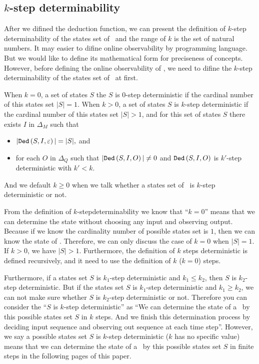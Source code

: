 \subsection{$k$-step determinability}
After we difined the deduction function, we can present the definition of $k$-step determinability of the states set of \BCNs\ and the range of $k$ is the set of natural numbers. It may easier to difine online observability by programming language. But we would like to define its mathematical form for preciseness of concepts. However, before defining the online observability of \BCNs, we need to difine the $k$-step determinability of the states set of \BCNs\ at first.
\begin{definition} 
When $k=0$, a set of states $S$ the $S$ is $0$-step deterministic if the cardinal number of this states set $|S|=1$. When $k>0$, a set of states $S$ is $k$-step deterministic
 if the cardinal number of this states set $|S|>1$, and for this set of states $S$ there exists $I$ in $\Delta_M$ such that
 \begin{itemize}
 \item  $|{\tt Ded}\left(S,I,\varepsilon\right)|=|S|, $ and 
 \item  for each $O$ in $\Delta_Q$ such that $|{\tt Ded}\left(S,I,O\right)|\neq 0$ and ${\tt Ded}\left(S,I,O\right)$ is $k'$-step deterministic with  ${k'}<k$.
 \end{itemize}
 And we default $k\ge0$ when we talk whether a states set of \BCNs\ is $k$-step deterministic or not.
\end{definition}

From the definition of {\em$k$}-stepdeterminability we know that ``$k=0$'' means that we can determine the state without choosing any input and observing output. Because if we know the cardinality number of possible states set is $1$, then we can know the state of \BCNs. Therefore, we can only discuss the case of $k=0$ when $|S|=1$. If $k>0$, we have $|S|>1$. Furthermore, the definition of $k$ steps deterministic is defined recursively, and it need to use the definition of $k$ ($k=0$) steps. 

Furthermore, if a states set $S$ is $k_1$-step deterministic and $k_1\leq k_2$, then $S$ is $k_2$-step deterministic. But if the states set $S$ is $k_1$-step deterministic and $k_1\geq k_2$, we can not make sure whether $S$ is $k_2$-step deterministic or not. Therefore you can consider the ``$S$ is $k$-step deterministic'' as ``We can determine the state of a \BCN\ by this possible states set $S$ in $k$ steps. And we finish this determination process by deciding input sequence and observing out sequence at each time step''. However, we say a possible states set $S$ is $k$-step deterministic ($k$ has no specific value) means that we can determine the state of a \BCN\ by this possible states set $S$ in finite steps in the following pages of this paper.
